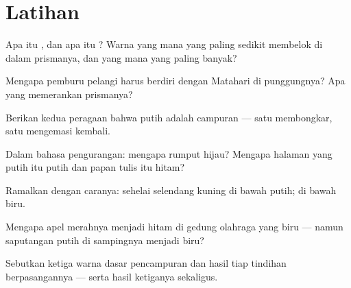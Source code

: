 \section{Latihan}

\begin{exercise}[$\star$]\label{exo:g8:colors-spectra:1}
Apa itu , dan apa itu ? Warna yang mana yang paling
sedikit membelok di dalam prismanya, dan yang mana yang paling banyak?
\end{exercise}

\begin{exercise}[$\star$]\label{exo:g8:colors-spectra:2}
Mengapa pemburu pelangi harus berdiri dengan Matahari di punggungnya?
Apa yang memerankan prismanya?
\end{exercise}

\begin{exercise}[$\star$]\label{exo:g8:colors-spectra:3}
Berikan kedua peragaan bahwa  putih adalah campuran --- satu
membongkar, satu mengemasi kembali.
\end{exercise}

\begin{exercise}[$\star$]\label{exo:g8:colors-spectra:4}
Dalam bahasa pengurangan: mengapa rumput hijau? Mengapa halaman yang
putih itu putih dan papan tulis itu hitam?
\end{exercise}

\begin{exercise}[$\star$]\label{exo:g8:colors-spectra:5}
Ramalkan dengan caranya: sehelai selendang kuning di bawah 
putih; di bawah  biru.
\end{exercise}

\begin{exercise}[$\star$]\label{exo:g8:colors-spectra:6}
Mengapa apel merahnya menjadi hitam di gedung olahraga yang biru ---
namun saputangan putih di sampingnya menjadi biru?
\end{exercise}

\begin{exercise}[$\star$]\label{exo:g8:colors-spectra:7}
Sebutkan ketiga warna dasar pencampuran  dan hasil tiap
tindihan berpasangannya --- serta hasil ketiganya sekaligus.
\end{exercise}


